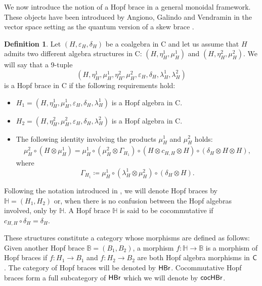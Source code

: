 \documentclass[11pt,reqno]{amsart}
\theoremstyle{plain}%
\theoremstyle{definition}
\newtheorem{definition}[theorem]{Definition}%
\theoremstyle{remark}
\begin{document}
We now introduce the notion of a Hopf brace in a general monoidal framework. These objects have been introduced by Angiono, Galindo and Vendramin \cite{AGV} in the vector space setting as the quantum version of a skew brace \cite{GV}.
\begin{definition}
	Let $(H,\varepsilon_{H},\delta_{H})$ be a coalgebra in {\sf C} and let us assume that $H$ admits two different algebra structures in {\sf C}: $(H,\eta_{H}^{1},\mu_{H}^{1})$ and $(H,\eta_{H}^{2},\mu_{H}^{2})$. We will say that a 9-tuple
	\[(H,\eta_{H}^{1},\mu_{H}^{1},\eta_{H}^{2},\mu_{H}^{2},\varepsilon_{H},\delta_{H},\lambda_{H}^{1},\lambda_{H}^{2})\]
	is a Hopf brace in {\sf C} if the following requirements hold:
	\begin{itemize}
		\item[(i)] $H_{1}=(H,\eta_{H}^{1},\mu_{H}^{1},\varepsilon_{H},\delta_{H},\lambda_{H}^{1})$ is a Hopf algebra in {\sf C}.
		\item[(ii)]  $H_{2}=(H,\eta_{H}^{2},\mu_{H}^{2},\varepsilon_{H},\delta_{H},\lambda_{H}^{2})$ is a Hopf algebra in {\sf C}.
		\item[(iii)] The following identity involving the products $\mu_{H}^{1}$ and $\mu_{H}^{2}$ holds:
		\begin{gather}\label{compatHbrace}
			\mu_{H}^{2}\circ(H\otimes\mu_{H}^{1})=\mu_{H}^{1}\circ(\mu_{H}^{2}\otimes\Gamma_{H_{1}})\circ(H\otimes c_{H,H}\otimes H)\circ(\delta_{H}\otimes H\otimes H),
		\end{gather}
		where 
		\begin{equation}\label{def_GammaH1}
			\Gamma_{H_{1}}\coloneqq \mu_{H}^{1}\circ(\lambda_{H}^{1}\otimes\mu_{H}^{2})\circ(\delta_{H}\otimes H).
		\end{equation}
	\end{itemize}
	
	Following the notation introduced in \cite{RGON}, we will denote Hopf braces by $\mathbb{H}=(H_{1},H_{2})$ or, when there is no confusion between the Hopf algebras involved, only by $\mathbb{H}$. A Hopf brace $\mathbb{H}$ is said to be cocommutative if $c_{H,H}\circ\delta_{H}=\delta_{H}$.
	
	These structures constitute a category whose morphisms are defined as follows: Given another Hopf brace $\mathbb{B}=(B_{1},B_{2})$, a morphism $f\colon \mathbb{H}\rightarrow \mathbb{B}$ is a morphism of Hopf braces if $f\colon H_{1}\rightarrow B_{1}$ and $f\colon H_{2}\rightarrow B_{2}$ are both Hopf algebra morphisms in ${\sf C}$. The category of Hopf braces will be denoted by ${\sf HBr}$. Cocommutative Hopf braces form a full subcategory of ${\sf HBr}$ which we will denote by ${\sf cocHBr}$.
\end{definition}
\end{document}
